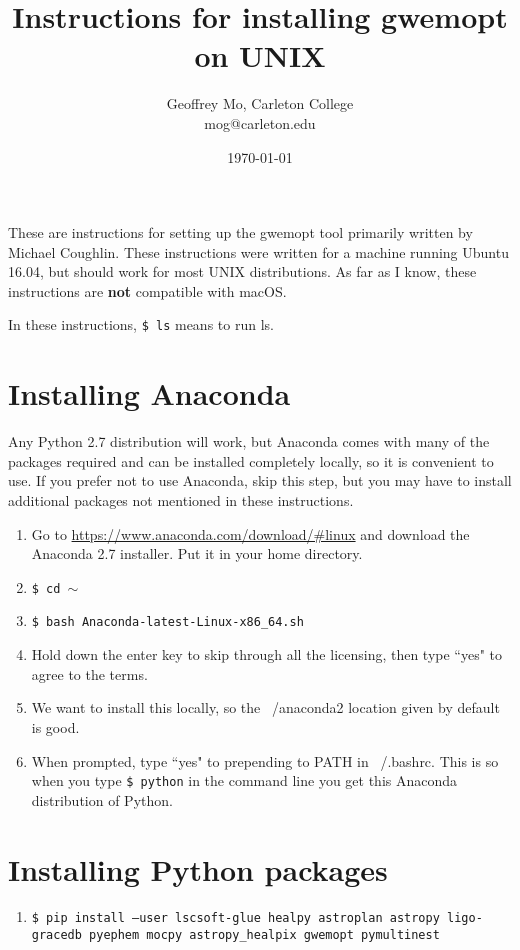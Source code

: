 \documentclass[11pt]{article}
\begin{document}
\title{Instructions for installing gwemopt on UNIX}
\date{\today}
\author{Geoffrey Mo, Carleton College\\mog@carleton.edu}

\maketitle

These are instructions for setting up the gwemopt tool primarily written by Michael Coughlin. These instructions were written for a machine running Ubuntu 16.04, but should work for most UNIX distributions. As far as I know, these instructions are {\bf not} compatible with macOS.

In these instructions, {\tt \$ ls} means to run ls.

\section{Installing Anaconda}
Any Python 2.7 distribution will work, but Anaconda comes with many of the packages required and can be installed completely locally, so it is convenient to use. If you prefer not to use Anaconda, skip this step, but you may have to install additional packages not mentioned in these instructions.

\begin{enumerate}
	\item Go to \url{https://www.anaconda.com/download/#linux} and download the Anaconda 2.7 installer. Put it in your home directory.
	\item {\tt \$ cd $\sim$} 
	\item {\tt \$ bash Anaconda-latest-Linux-x86\_64.sh}
	\item Hold down the enter key to skip through all the licensing, then type ``yes" to agree to the terms. 
	\item We want to install this locally, so the ~/anaconda2 location given by default is good.
	\item When prompted, type ``yes" to prepending to PATH in ~/.bashrc. This is so when you type {\tt \$ python} in the command line you get this Anaconda distribution of Python.
\end{enumerate}


\section{Installing Python packages}
\begin{enumerate}
	\item {\tt \$ pip install --user lscsoft-glue healpy astroplan astropy ligo-gracedb pyephem mocpy astropy\_healpix gwemopt pymultinest}
\end{enumerate}
\end{document}
